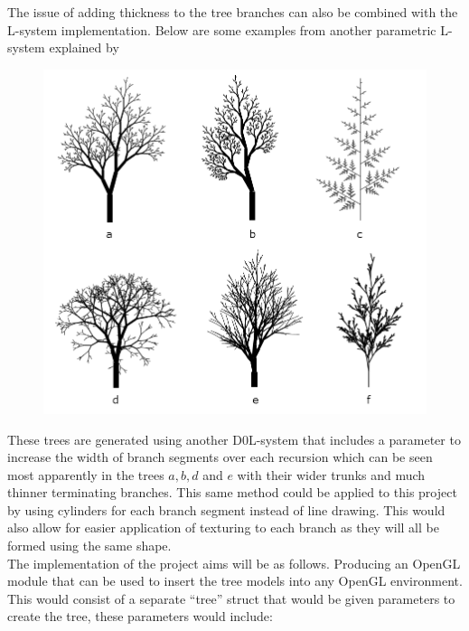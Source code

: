 \documentclass[progress]{cmpreport}
\begin{document}
The issue of adding thickness to the tree branches can also be combined with the L-system 
implementation. Below are some examples from another parametric L-system explained by 
\cite{prusinkiewicz1996systems} 

\begin{figure}[h]
        \includegraphics[scale=0.6]{tree_examples}
        \centering
\end{figure}

These trees are generated using another D0L-system that includes a parameter to increase the 
width of branch segments over each recursion which can be seen most apparently in the trees 
$a, b, d$ and $e$ with their wider trunks and much thinner terminating branches. This same 
method could be applied to this project by using cylinders for each branch segment instead of 
line drawing. This would also allow for easier application of texturing to each branch as they 
will all be formed using the same shape. \\ 

The implementation of the project aims will be as follows. Producing an OpenGL module 
that can be used to insert the tree models into any OpenGL environment. This would consist of 
a separate ``tree'' struct that would be given parameters to create the tree, these parameters 
would include: 
\end{document}
